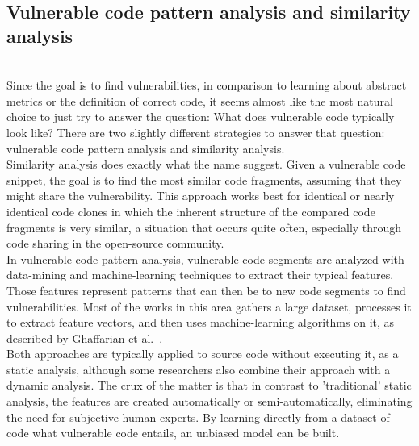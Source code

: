 \documentclass[
a4paper,
pagesize,
pdftex,
12pt,
twoside, %
BCOR=5mm, %
ngerman,
fleqn,
final,
]{scrartcl}
\begin{document}
	\subsection{Vulnerable code pattern analysis and similarity analysis}\mbox{}\\
	Since the goal is to find vulnerabilities, in comparison to learning about abstract metrics or the definition of correct code, it seems almost like the most natural choice to just try to answer the question: What does vulnerable code typically look like? There are two slightly different strategies to answer that question: vulnerable code pattern analysis and similarity analysis.\\
	Similarity analysis does exactly what the name suggest. Given a vulnerable code snippet, the goal is to find the most similar code fragments, assuming that they might share the vulnerability. This approach works best for identical or nearly identical code clones in which the inherent structure of the compared code fragments is very similar\cite{Li.2018}, a situation that occurs quite often, especially through code sharing in the open-source community.\\
	In vulnerable code pattern analysis, vulnerable code segments are analyzed with data-mining and machine-learning techniques to extract their typical features. Those features represent patterns that can then be to new code segments to find vulnerabilities. Most of the works in this area gathers a large dataset, processes it to extract feature vectors, and then uses machine-learning algorithms on it, as described by Ghaffarian et al.~\cite{Ghaffarian.2017}.\\
	Both approaches are typically applied to source code without executing it, as a static analysis, although some researchers also combine their approach with a dynamic analysis. The crux of the matter is that in contrast to 'traditional' static analysis, the features are created automatically or semi-automatically, eliminating the need for subjective human experts. By learning directly from a dataset of code what vulnerable code entails, an unbiased model can be built.\\
	
\end{document}
